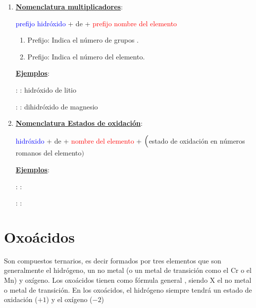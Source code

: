 \documentclass[12pt]{article}
\begin{document}
\begin{enumerate}[label=\itembolascolor{\arabic*}{blue}]
    \item \textbf{\uline{Nomenclatura multiplicadores}}:
          \begin{center}
              \textcolor{blue}{prefijo hidróxido} + de + \textcolor{red}{prefijo nombre del elemento}
          \end{center}

          \begin{enumerate}[label=\textcolor{red}{$\bullet$}]
              \item Prefijo: Indica el número de grupos .
              \item Prefijo: Indica el número del elemento.
          \end{enumerate}

          \textbf{\uline{Ejemplos}}:

           : : hidróxido de litio

           : : dihidróxido de magnesio

    \item \textbf{\uline{Nomenclatura Estados de oxidación}}:
          \begin{center}
              \textcolor{blue}{hidróxido} + de + \textcolor{red}{nombre del elemento} + $\Bigl($\textcolor{green!50!black}{estado de oxidación en números romanos del elemento}$\Bigr)$
          \end{center}

          \textbf{\uline{Ejemplos}}:

           : : 

           : : 

\end{enumerate}
\newpage

\section{Oxoácidos}

Son compuestos ternarios, es decir formados por tres elementos que son generalmente el hidrógeno, un no metal (o un metal de transición como el Cr o el Mn) y oxígeno. Los oxoácidos tienen como fórmula general , siendo X el no metal o metal de transición. En los oxoácidos, el hidrógeno siempre tendrá un estado de oxidación ($+1$) y el oxígeno ($-2$)
\end{document}
